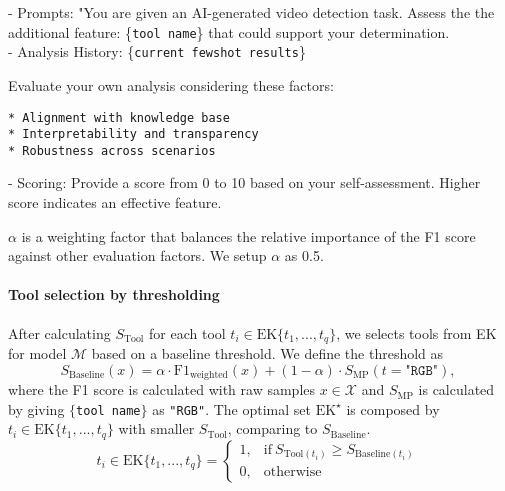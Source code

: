 \begin{tcolorbox}[colback=white!5!white,colframe=gray!2!gray,arc=2mm,fontupper=\small]
\begin{adjustbox}{minipage=[c][0.60\linewidth]{1\linewidth}}
- Prompts: "You are given an AI-generated video detection task. Assess the the additional feature: \{\texttt{tool name}\} that could support your determination. \\
- Analysis History: \{\texttt{current fewshot results}\}

Evaluate your own analysis considering these factors:
\vspace{-1mm}
 \begin{tcolorbox}[colback=blue!20!white,,colframe=white!5!white, top=0.5pt,bottom=0.5pt]
\begin{lstlisting}[basicstyle=\footnotesize]
* Alignment with knowledge base
* Interpretability and transparency
* Robustness across scenarios
\end{lstlisting}
\end{tcolorbox}
\vspace{-1mm}
- Scoring: Provide a score from 0 to 10 based on your self-assessment. Higher score indicates an effective feature.
\end{adjustbox}
\end{tcolorbox}

$\alpha$ is a weighting factor that balances the relative importance of the F1 score against other evaluation factors. 
We setup $\alpha$ as 0.5. 

\paragraph{Tool selection by thresholding}
After calculating $S_{\text{Tool}}$ for each tool $t_i \in \text{EK}\{t_1, ..., t_q\}$, we selects tools from EK for model $\mathcal{M}$ based on a baseline threshold. We define the threshold as
\begin{equation}
    S_{\text{Baseline}}(x) = \alpha \cdot \text{F1}_{\text{weighted}}(x) + (1 - \alpha) \cdot S_{\text{MP}}(t=\texttt{"RGB"}), \ \nonumber
\label{eqn:selection_metrics}
\end{equation}
where the F1 score is calculated with raw samples $x \in \mathcal{X}$ and $S_{\text{MP}}$ is calculated by giving $\{$\texttt{tool name}$\}$ as \texttt{"RGB"}.
 The optimal set $\text{EK}^\star$ is composed by $t_i \in \text{EK}\{t_1, ..., t_q\}$ with smaller $S_{\text{Tool}}$, comparing to $S_{\text{Baseline}}$.
\begin{equation}
   t_i \in \text{EK}\{t_1, ..., t_q\} =
   \begin{cases}
      1, & \text{if}\ S_{\text{Tool}(t_i)} \geq S_{\text{Baseline}(t_i)} \\
      0, & \text{otherwise}
    \end{cases}  \ \nonumber
\label{eqn:selection_metrics}
\end{equation}

